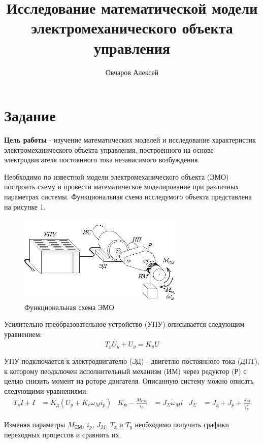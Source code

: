 \documentclass[a4paper, 12pt]{article}
\author{Овчаров Алексей}
\title{Исследование математической модели электромеханического объекта управления}
\begin{document}
\maketitle

\section{Задание}
\textbf{Цель работы} - изучение математических моделей и исследование характеристик электромеханического объекта управления, построенного на основе электродвигателя постоянного тока независимого возбуждения. \par
Необходимо по известной модели электромеханического объекта (ЭМО) построить схему и провести математическое моделирование при различных параметрах системы. Функциональная схема исследумого объекта представлена на рисунке 1.
\begin{figure} [h!]
    \centering
    \includegraphics[width = 0.7\textwidth]{images/EMO.png}
    \caption{Функциональная схема ЭМО}
\end{figure} \par
Усилительно-преобразовательное устройство (УПУ) описывается следующим уравнением:
\begin{equation}
    T_y\dot{U_y} + U_y = K_yU
\end{equation} \par
УПУ подключается к электродвигателю (ЭД) - двигетлю постоянного тока (ДПТ), к которому пеодключен исполнительный механизм (ИМ) через редуктор (Р) с целью снизить момент на роторе двигателя. Описанную систему можно описать следующими уравнениями.
\begin{align}
    T_\text{я}\dot{I} + I & = K_\text{д}(U_y + K_e\omega_Mi_p) &
    K_\text{м} - \frac{M_\text{СМ}}{i_p} & = J_\Sigma\dot{\omega}_Mi &
    J_\Sigma & = J_\text{д} + J_p + \frac{J_M}{i_p^2}
\end{align} \par
Изменяя параметры $M_\text{СМ}$, $i_p$, $J_M$, $T_\text{я}$ и $T_y$ необходимо получить графики переходных процессов и сравнить их.
\end{document}
